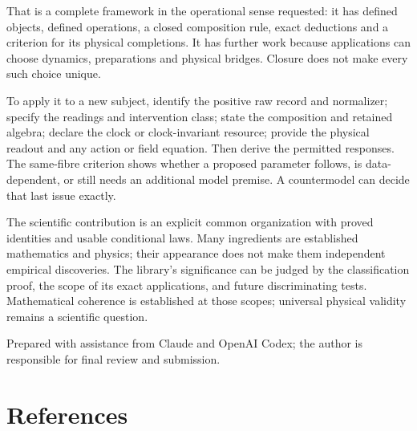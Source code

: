 \documentclass[
  11pt,
  a4paper,
]{article}
\begin{document}
That is a complete framework in the operational sense requested: it has defined objects, defined operations, a closed composition rule, exact deductions and a criterion for its physical completions. It has further work because applications can choose dynamics, preparations and physical bridges. Closure does not make every such choice unique.

To apply it to a new subject, identify the positive raw record and normalizer; specify the readings and intervention class; state the composition and retained algebra; declare the clock or clock-invariant resource; provide the physical readout and any action or field equation. Then derive the permitted responses. The same-fibre criterion shows whether a proposed parameter follows, is data-dependent, or still needs an additional model premise. A countermodel can decide that last issue exactly.

The scientific contribution is an explicit common organization with proved identities and usable conditional laws. Many ingredients are established mathematics and physics; their appearance does not make them independent empirical discoveries. The library's significance can be judged by the classification proof, the scope of its exact applications, and future discriminating tests. Mathematical coherence is established at those scopes; universal physical validity remains a scientific question.

Prepared with assistance from Claude and OpenAI Codex; the author is responsible for final review and submission.

\section{References}\label{references}
\end{document}
